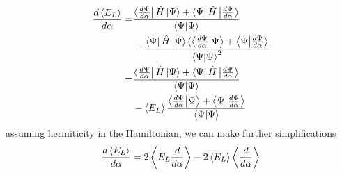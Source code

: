 \begin{equation*}
    \begin{split}
        \frac{d\expval{E_L}}{d\alpha} =& \frac{\bra{\frac{d\Psi}{d\alpha}}\hat{H}\ket{\Psi} + \bra{\Psi}\hat{H}\ket{\frac{d\Psi}{d\alpha}}}{\braket{\Psi}}  \\
        &- \frac{\bra{\Psi}\hat{H}\ket{\Psi}(\bra{\frac{d\Psi}{d\alpha}}\ket{\Psi}+\bra{\Psi}\ket{\frac{d\Psi}{d\alpha}}}{\braket{\Psi}^2} \\
        =& \frac{\bra{\frac{d\Psi}{d\alpha}}\hat{H}\ket{\Psi} + \bra{\Psi}\hat{H}\ket{\frac{d\Psi}{d\alpha}}}{\braket{\Psi}} \\
        &- \expval{E_L}\frac{\bra{\frac{d\Psi}{d\alpha}}\ket{\Psi}+\bra{\Psi}\ket{\frac{d\Psi}{d\alpha}}}{\braket{\Psi}}
    \end{split}
\end{equation*}
assuming hermiticity in the Hamiltonian, we can make further simplifications 
\begin{equation}\label{eq:possible_solution}
    \begin{split}
        \frac{d\expval{E_L}}{d\alpha} = 2\expval{E_L\frac{d}{d\alpha}}-2\expval{E_L}\expval{\frac{d}{d\alpha}}
    \end{split}
\end{equation}



